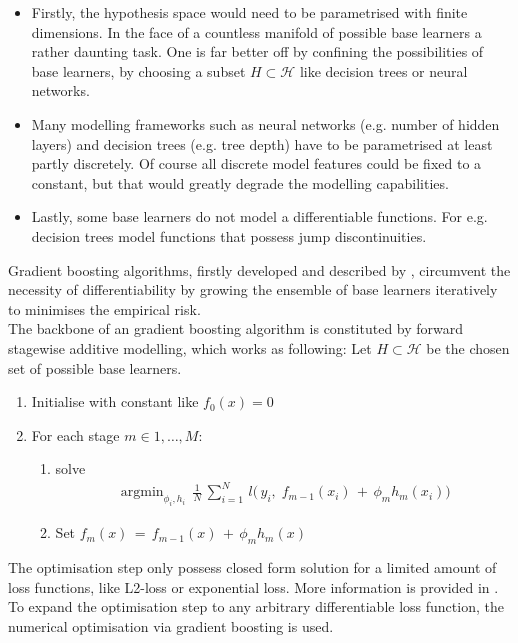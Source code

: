 \documentclass[a4paper, 11pt]{article}
\DeclareMathOperator*{\argmin}{argmin} %
\begin{document}
\begin{itemize}
\item Firstly, the hypothesis space would need to be parametrised with finite dimensions. In the face of a countless manifold of possible base learners a rather daunting task. One is far better off by confining the possibilities of base learners, by choosing a subset $H \subset \mathcal{H}$ like decision trees or neural networks.

\item Many modelling frameworks such as neural networks (e.g. number of hidden layers) and decision trees (e.g. tree depth) have to be parametrised at least partly discretely. Of course all discrete model features could be fixed to a constant, but that would greatly degrade the modelling capabilities.

\item Lastly, some base learners do not model a differentiable functions. For e.g. decision trees model functions that possess jump discontinuities.

\end{itemize}

Gradient boosting algorithms, firstly developed and described by \cite{freund1997decision, friedman2001greedy, friedman2002stochastic}, circumvent the necessity of differentiability by growing the ensemble of base learners iteratively to minimises the empirical risk.\\
The backbone of an gradient boosting algorithm is constituted by forward stagewise additive modelling, which works as following:
Let $H \subset \mathcal{H}$ be the chosen set of possible base learners.

\begin{enumerate}
\item Initialise with constant like $f_0(x) = 0$
\item For each stage $m \in 1,\ldots,M$:
\begin{enumerate}
\item solve \begin{align*}
\argmin_{\phi_i, h_i}\, \frac{1}{N}\, \sum_{i = 1}^{N}\,  l\big(\,y_i,\; f_{m-1}(x_i)\, +\, \phi_m h_m(x_i)\big)
\end{align*}
\item Set $f_m(x)\, =\, f_{m-1}(x)\, +\, \phi_m h_m(x)$
\end{enumerate}
\end{enumerate}

The optimisation step only possess closed form solution for a limited amount of loss functions, like L2-loss or exponential loss. More information is provided in \cite{friedman2000additive}. To expand the optimisation step to any arbitrary differentiable loss function, the numerical optimisation via gradient boosting is used. \\
\end{document}
